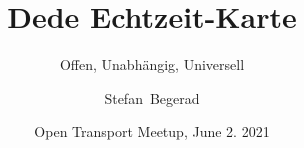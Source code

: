 


\usepackage{hyperref}

\title[Dede]%
{Dede Echtzeit-Karte}

\subtitle{Offen, Unabhängig, Universell}

\author[Begerad]%
{Stefan~Begerad}

\date[OTM, 6.2.2021]%
{Open Transport Meetup, June 2. 2021}
